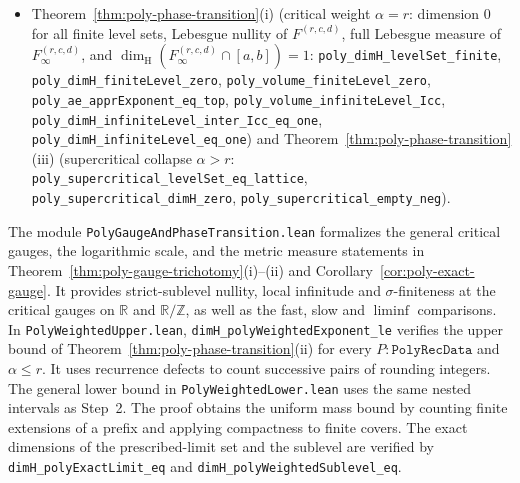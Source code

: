 \documentclass[11pt]{article}
\theoremstyle{definition}
\theoremstyle{remark}
\newcommand{\R}{\mathbb{R}}
\newcommand{\Z}{\mathbb{Z}}
\newcommand{\dimH}{\dim_{\mathrm{H}}}
\begin{document}
\begin{itemize}[leftmargin=1.8em]
\texttt{neg\_\allowbreak xPlusPoly\_\allowbreak mem\_\allowbreak signedExactLimitSet},
\texttt{poly\_\allowbreak trichotomy\_\allowbreak part\_\allowbreak iii\_\allowbreak complete});
\item Theorem~\ref{thm:poly-phase-transition}(i) (critical weight $\alpha=r$:
dimension $0$ for all finite level sets, Lebesgue nullity of
$F^{(r,c,d)}$, full Lebesgue measure of $F_\infty^{(r,c,d)}$, and
$\dimH(F_\infty^{(r,c,d)}\cap[a,b])=1$:
\texttt{poly\_\allowbreak dimH\_\allowbreak levelSet\_\allowbreak finite},
\texttt{poly\_\allowbreak dimH\_\allowbreak finiteLevel\_\allowbreak zero},
\texttt{poly\_\allowbreak volume\_\allowbreak finiteLevel\_\allowbreak zero},
\texttt{poly\_\allowbreak ae\_\allowbreak apprExponent\_\allowbreak eq\_\allowbreak top},
\texttt{poly\_\allowbreak volume\_\allowbreak infiniteLevel\_\allowbreak Icc},
\texttt{poly\_\allowbreak dimH\_\allowbreak infiniteLevel\_\allowbreak inter\_\allowbreak Icc\_\allowbreak eq\_\allowbreak one},
\texttt{poly\_\allowbreak dimH\_\allowbreak infiniteLevel\_\allowbreak eq\_\allowbreak one})
and Theorem~\ref{thm:poly-phase-transition}(iii) (supercritical collapse
$\alpha>r$:
\texttt{poly\_\allowbreak supercritical\_\allowbreak levelSet\_\allowbreak eq\_\allowbreak lattice},
\texttt{poly\_\allowbreak supercritical\_\allowbreak dimH\_\allowbreak zero},
\texttt{poly\_\allowbreak supercritical\_\allowbreak empty\_\allowbreak neg}).
\end{itemize}
The module \texttt{PolyGaugeAndPhaseTransition.lean} formalizes the
general critical gauges, the logarithmic scale, and the metric measure
statements in Theorem~\ref{thm:poly-gauge-trichotomy}(i)--(ii) and
Corollary~\ref{cor:poly-exact-gauge}. It provides strict-sublevel nullity,
local infinitude and $\sigma$-finiteness at the critical gauges on
$\R$ and $\R/\Z$, as well as the fast, slow and $\liminf$ comparisons.
In \texttt{PolyWeightedUpper.lean},
\texttt{dimH\_\allowbreak polyWeightedExponent\_\allowbreak le} verifies
the upper bound of Theorem~\ref{thm:poly-phase-transition}(ii) for every
$P:\texttt{PolyRecData}$ and $\alpha\le r$. It uses recurrence defects to count successive pairs of rounding
integers. The general lower bound in \texttt{PolyWeightedLower.lean}
uses the same nested intervals as Step~2. The proof obtains the uniform
mass bound by counting finite extensions of a prefix and applying
compactness to finite covers. The exact dimensions of the prescribed-limit
set and the sublevel are verified by
\texttt{dimH\_\allowbreak polyExactLimit\_\allowbreak eq} and
\texttt{dimH\_\allowbreak polyWeightedSublevel\_\allowbreak eq}.
\end{document}
